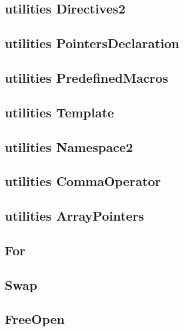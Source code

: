 \subsection{utilities Directives2}
\raggedbottom
\hrulefill
\subsection{utilities PointersDeclaration}
\raggedbottom
\hrulefill
\subsection{utilities PredefinedMacros}
\raggedbottom
\hrulefill
\subsection{utilities Template}
\raggedbottom
\hrulefill
\subsection{utilities Namespace2}
\raggedbottom
\hrulefill
\subsection{utilities CommaOperator}
\raggedbottom
\hrulefill
\subsection{utilities ArrayPointers}
\raggedbottom
\hrulefill
\subsection{ For}
\raggedbottom
\hrulefill
\subsection{ Swap}
\raggedbottom
\hrulefill
\subsection{ FreeOpen}
\raggedbottom
\hrulefill
